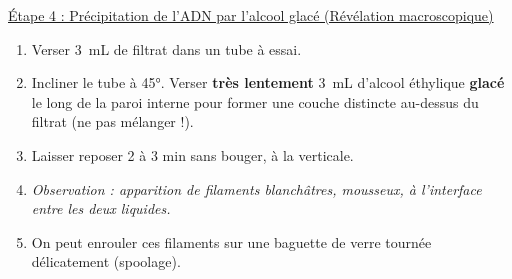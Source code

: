 \documentclass[11pt]{article}
\begin{document}
\begin{methode}
\underline{Étape 4 : Précipitation de l'ADN par l'alcool glacé (Révélation macroscopique)}
\begin{enumerate}
    \item Verser \SI{3}{mL} de filtrat dans un tube à essai.
    \item Incliner le tube à \ang{45}. Verser \textbf{très lentement} \SI{3}{mL} d'alcool éthylique \textbf{glacé} le long de la paroi interne pour former une couche distincte au-dessus du filtrat (ne pas mélanger !).
    \item Laisser reposer 2 à 3 min sans bouger, à la verticale.
    \item \textit{Observation : apparition de filaments blanchâtres, mousseux, à l'interface entre les deux liquides.}
    \item On peut enrouler ces filaments sur une baguette de verre tournée délicatement (spoolage).
\end{enumerate}
\end{methode}
\end{document}
